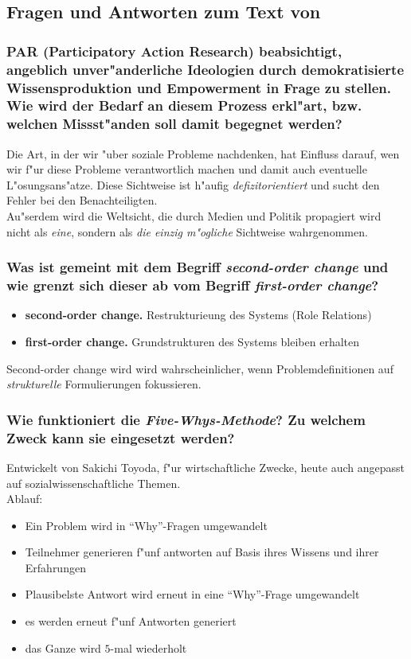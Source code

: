 \subsection{Fragen und Antworten zum Text von \textcite{kohfeldt_five_2012-1}}
\subsubsection{PAR (Participatory Action Research) beabsichtigt, angeblich unver"anderliche Ideologien durch demokratisierte Wissensproduktion und Empowerment in Frage zu stellen. Wie wird der Bedarf an diesem Prozess erkl"art, bzw. welchen Missst"anden soll damit begegnet werden?}
Die Art, in der wir "uber soziale Probleme nachdenken, hat Einfluss darauf, wen wir f"ur diese Probleme verantwortlich machen und damit auch eventuelle L"osungsans"atze. Diese Sichtweise ist h"aufig \emph{defizitorientiert} und sucht den Fehler bei den Benachteiligten.\\
Au"serdem wird die Weltsicht, die durch Medien und Politik propagiert wird nicht als \emph{eine}, sondern als \emph{die einzig m"ogliche} Sichtweise wahrgenommen.

\subsubsection{Was ist gemeint mit dem Begriff \emph{second-order change} und wie grenzt sich dieser ab vom Begriff \emph{first-order change}?}
\begin{itemize}
        \item \textbf{second-order change.} Restrukturieung des Systems (Role Relations)
        \item \textbf{first-order change.} Grundstrukturen des Systems bleiben erhalten
\end{itemize}

Second-order change wird wird wahrscheinlicher, wenn Problemdefinitionen auf \emph{strukturelle} Formulierungen fokussieren.

\subsubsection{Wie funktioniert die \emph{Five-Whys-Methode}? Zu welchem Zweck kann sie eingesetzt werden?}
Entwickelt von Sakichi Toyoda, f"ur wirtschaftliche Zwecke, heute auch angepasst auf sozialwissenschaftliche Themen.\\
Ablauf:
\begin{itemize}
        \item Ein Problem wird in ``Why''-Fragen umgewandelt
        \item Teilnehmer generieren f"unf antworten auf Basis ihres Wissens und ihrer Erfahrungen
        \item Plausibelste Antwort wird erneut in eine ``Why''-Frage umgewandelt
        \item es werden erneut f"unf Antworten generiert
        \item das Ganze wird $5$-mal wiederholt
\end{itemize}

